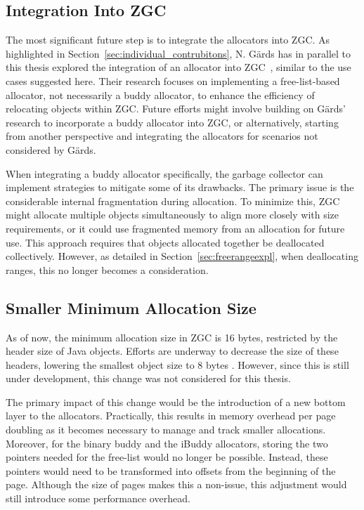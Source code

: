 \subsection{Integration Into ZGC} \label{sec:futureworkZ}
The most significant future step is to integrate the allocators into ZGC. As highlighted in Section~\ref{sec:individual_contrubitons}, N. Gärds has in parallel to this thesis explored the integration of an allocator into ZGC~\cite{niclas}, similar to the use cases suggested here. Their research focuses on implementing a free-list-based allocator, not necessarily a buddy allocator, to enhance the efficiency of relocating objects within ZGC. Future efforts might involve building on Gärds' research to incorporate a buddy allocator into ZGC, or alternatively, starting from another perspective and integrating the allocators for scenarios not considered by Gärds.

When integrating a buddy allocator specifically, the garbage collector can implement strategies to mitigate some of its drawbacks. The primary issue is the considerable internal fragmentation during allocation. To minimize this, ZGC might allocate multiple objects simultaneously to align more closely with size requirements, or it could use fragmented memory from an allocation for future use. This approach requires that objects allocated together be deallocated collectively. However, as detailed in Section~\ref{sec:freerangeexpl}, when deallocating ranges, this no longer becomes a consideration.

\subsection{Smaller Minimum Allocation Size}
As of now, the minimum allocation size in ZGC is 16 bytes, restricted by the header size of Java objects. Efforts are underway to decrease the size of these headers, lowering the smallest object size to 8 bytes \cite{liliput}. However, since this is still under development, this change was not considered for this thesis.

The primary impact of this change would be the introduction of a new bottom layer to the allocators. Practically, this results in memory overhead per page doubling as it becomes necessary to manage and track smaller allocations. Moreover, for the binary buddy and the iBuddy allocators, storing the two pointers needed for the free-list would no longer be possible. Instead, these pointers would need to be transformed into offsets from the beginning of the page. Although the size of pages makes this a non-issue, this adjustment would still introduce some performance overhead.

